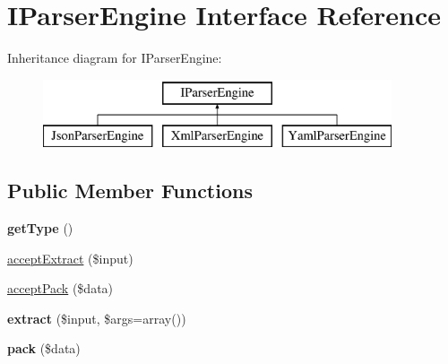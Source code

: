 \hypertarget{interface_utopia_1_1_components_1_1_data_parser_1_1_i_parser_engine}{
\section{IParserEngine Interface Reference}
\label{interface_utopia_1_1_components_1_1_data_parser_1_1_i_parser_engine}
}
Inheritance diagram for IParserEngine:\begin{figure}[H]
\begin{center}
\leavevmode
\includegraphics[height=2.000000cm]{interface_utopia_1_1_components_1_1_data_parser_1_1_i_parser_engine}
\end{center}
\end{figure}
\subsection*{Public Member Functions}
\begin{DoxyCompactItemize}
\item 
\hypertarget{interface_utopia_1_1_components_1_1_data_parser_1_1_i_parser_engine_a830b5c75df72b32396701bc563fbe3c7}{
{\bfseries getType} ()}
\label{interface_utopia_1_1_components_1_1_data_parser_1_1_i_parser_engine_a830b5c75df72b32396701bc563fbe3c7}

\item 
\hyperlink{interface_utopia_1_1_components_1_1_data_parser_1_1_i_parser_engine_aa40a2c570a65e6f8d8a55af28cd6e595}{acceptExtract} (\$input)
\item 
\hyperlink{interface_utopia_1_1_components_1_1_data_parser_1_1_i_parser_engine_a0e48ec53c3dc0fdc3918ca54041744e7}{acceptPack} (\$data)
\item 
\hypertarget{interface_utopia_1_1_components_1_1_data_parser_1_1_i_parser_engine_a3dffec125cfe41516f0ae24acdb87901}{
{\bfseries extract} (\$input, \$args=array())}
\label{interface_utopia_1_1_components_1_1_data_parser_1_1_i_parser_engine_a3dffec125cfe41516f0ae24acdb87901}

\item 
\hypertarget{interface_utopia_1_1_components_1_1_data_parser_1_1_i_parser_engine_ab1243b982f1390bcc329bcefa5dda6a3}{
{\bfseries pack} (\$data)}
\label{interface_utopia_1_1_components_1_1_data_parser_1_1_i_parser_engine_ab1243b982f1390bcc329bcefa5dda6a3}

\end{DoxyCompactItemize}


